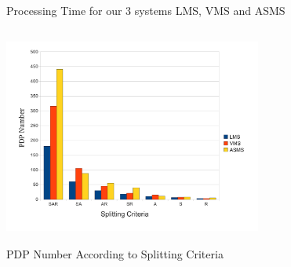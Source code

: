 {\begin{itemize}
\end{itemize} 
\begin{figure}
  \centering
  \caption{Processing Time for our 3 systems LMS, VMS and ASMS}
  \label{fig:processing time}
\end{figure}
\begin{figure}[!h]
  \centering
\includegraphics[width=8.5cm, height=7.2cm]{pdpnumber.pdf}
\begin{center}
\caption{PDP Number According to Splitting Criteria}
\label{pdpnumber}
\end{center}
\end{figure} 

}
